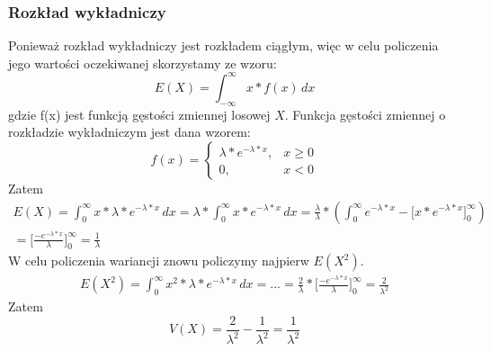 \documentclass[10pt, a4paper]{article}
\begin{document}
\subsubsection*{Rozkład wykładniczy}
Ponieważ rozkład wykładniczy jest rozkładem ciągłym, więc w celu policzenia jego wartości oczekiwanej skorzystamy ze wzoru:
\begin{equation}
E(X) = \int_{-\infty}^{\infty} x * f(x) \,dx
\end{equation}
gdzie f(x) jest funkcją gęstości zmiennej losowej $X$. Funkcja gęstości zmiennej o rozkładzie wykładniczym jest dana wzorem:
\begin{equation}
f(x) =  \begin{cases}
        \lambda * e^{-\lambda * x}, & x \geq 0 \\
        0, & x < 0
  		\end{cases}
\end{equation}
Zatem
\begin{align*}
E(X) =  \int_{0}^{\infty} x * \lambda * e^{-\lambda * x} \,dx = \lambda * \int_{0}^{\infty} x * e^{-\lambda * x} \,dx = \frac{\lambda}{\lambda} * ( \int_{0}^{\infty} e^{-\lambda * x} - \Big[ x * e^{-\lambda * x}\Big]_0^{\infty}) \\ = \Big[ \frac{-e^{-\lambda * x}}{\lambda}\Big]_0^{\infty} = \frac{1}{\lambda}
\end{align*}
W celu policzenia wariancji znowu policzymy najpierw $E(X^2)$.
\begin{align*}
E(X^2) =  \int_{0}^{\infty} x^2 * \lambda * e^{-\lambda * x} \,dx = ... = \frac{2}{\lambda} * \Big[ \frac{-e^{-\lambda * x}}{\lambda}\Big]_0^{\infty} = \frac{2}{\lambda ^ 2}
\end{align*}
Zatem
\begin{equation}
V(X) =  \frac{2}{\lambda ^ 2} -  \frac{1}{\lambda ^ 2} = \frac{1}{\lambda ^ 2}
\end{equation}
\end{document}

